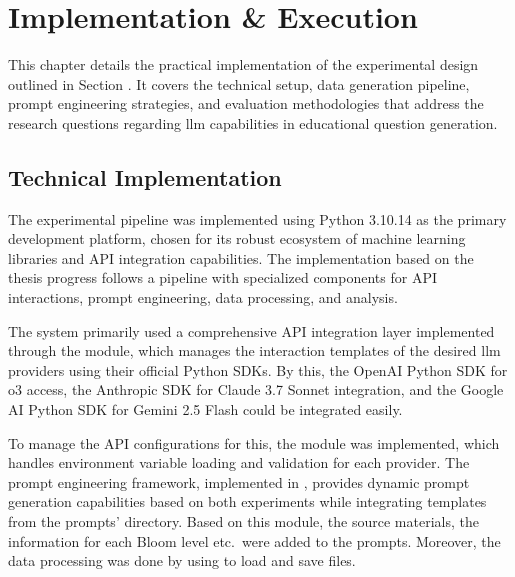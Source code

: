 \section{Implementation \& Execution} 
\label{sec:implementation-and-execution}

This chapter details the practical implementation of the experimental design outlined in Section . It covers the technical setup, data generation pipeline, prompt engineering strategies, and evaluation methodologies that address the research questions regarding \ac{llm} capabilities in educational question generation.

\subsection{Technical Implementation}

The experimental pipeline was implemented using Python 3.10.14 as the primary development platform, chosen for its robust ecosystem of machine learning libraries and API integration capabilities. The implementation based on the thesis progress follows a pipeline with specialized components for API interactions, prompt engineering, data processing, and analysis.

The system primarily used a comprehensive API integration layer implemented through the  module, which manages the interaction templates of the desired \ac{llm} providers using their official Python SDKs. By this, the OpenAI Python SDK for o3 access, the Anthropic SDK for Claude 3.7 Sonnet integration, and the Google AI Python SDK for Gemini 2.5 Flash could be integrated easily.

To manage the API configurations for this, the  module was implemented, which handles environment variable loading and validation for each provider. The prompt engineering framework, implemented in , provides dynamic prompt generation capabilities based on both experiments while integrating templates from the prompts' directory. Based on this module, the source materials, the information for each Bloom level etc.\ were added to the prompts. Moreover, the data processing was done by using  to load and save files.

